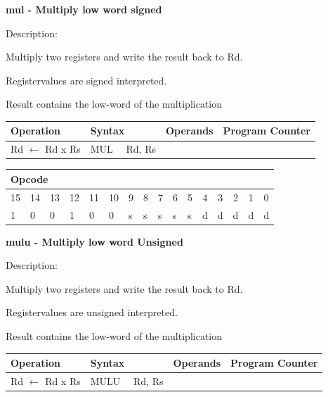 \documentclass[%
	pdftex,
	a4paper,
	oneside,
	bibtotoc,%
	idxtotoc,%
	bibtotocnumbered,
	halfparskip,%
]{scrbook}
\begin{document}
\bigskip

\textbf{mul - Multiply low word signed}

Description:

Multiply two registers and write the result back to Rd.

Registervalues are signed interpreted.

Result contains the low-word of the multiplication

\begin{tabular}{|l|l|l|l|}
\hline
Operation & Syntax & Operands & Program Counter \\ \hline
Rd $\leftarrow $ Rd x Rs & MUL \ \ Rd, Rs &  &  \\ \hline
\end{tabular}

\begin{tabular}{|c|c|c|c|c|c|c|c|c|c|c|c|c|c|c|c|}
\hline
\multicolumn{6}{|l|}{Opcode} & \multicolumn{5}{|l|}{} & \multicolumn{5}{|l|}{
} \\ \hline
15 & 14 & 13 & 12 & 11 & 10 & 9 & 8 & 7 & 6 & 5 & 4 & 3 & 2 & 1 & 0 \\ \hline
\multicolumn{1}{|l|}{1} & \multicolumn{1}{|l|}{0} & \multicolumn{1}{|l|}{0}
& \multicolumn{1}{|l|}{1} & \multicolumn{1}{|l|}{0} & \multicolumn{1}{|l|}{0}
& \multicolumn{1}{|l|}{s} & \multicolumn{1}{|l|}{s} & \multicolumn{1}{|l|}{s}
& \multicolumn{1}{|l|}{s} & \multicolumn{1}{|l|}{s} & \multicolumn{1}{|l|}{d}
& \multicolumn{1}{|l|}{d} & \multicolumn{1}{|l|}{d} & \multicolumn{1}{|l|}{d}
& \multicolumn{1}{|l|}{d} \\ \hline
\end{tabular}

\bigskip

\textbf{mulu - Multiply low word Unsigned}

Description:

Multiply two registers and write the result back to Rd.

Registervalues are unsigned interpreted.

Result contains the low-word of the multiplication

\begin{tabular}{|l|l|l|l|}
\hline
Operation & Syntax & Operands & Program Counter \\ \hline
Rd $\leftarrow $ Rd x Rs & MULU \ \ Rd, Rs &  &  \\ \hline
\end{tabular}
\end{document}
